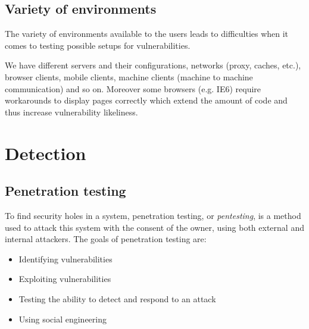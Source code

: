 \subsection{Variety of environments}

The variety of environments available to the users leads to
difficulties when it comes to testing possible setups for
vulnerabilities.

We have different servers and their configurations, networks (proxy, caches,
etc.), browser clients, mobile clients, machine clients (machine to machine
communication) and so on.
Moreover some browsers (e.g. IE6) require workarounds to
display pages correctly which extend the amount of code and thus
increase vulnerability likeliness.

\section{Detection}

\subsection{Penetration testing}

To find security holes in a system, penetration testing, or \emph{pentesting}, is a
method used to attack this system with the consent of the owner, using both
external and internal attackers. The goals of penetration testing are:
\begin{itemize}
\item Identifying vulnerabilities
\item Exploiting vulnerabilities
\item Testing the ability to detect and respond to an attack
\item Using social engineering
\end{itemize}

